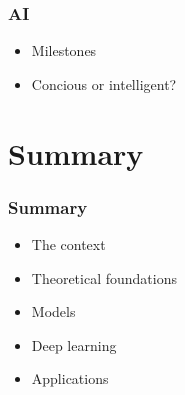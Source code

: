 \documentclass[xcolor={dvipsnames}]{beamer}
\begin{document}
\begin{frame}
  \frametitle{AI}
  \begin{itemize}
    \item<+-> Milestones
    \item<+-> Concious or intelligent?
  \end{itemize}
\end{frame}

\section{Summary}

\begin{frame}
  \frametitle{Summary}
  \begin{itemize}
    \item<+-> The context
    \item<+-> Theoretical foundations
    \item<+-> Models
    \item<+-> Deep learning
    \item<+-> Applications
  \end{itemize}
\end{frame}
\end{document}
